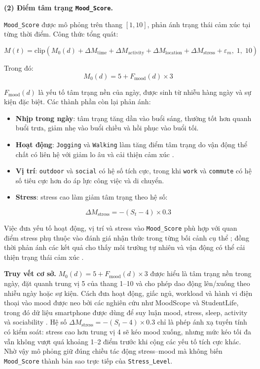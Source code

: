 \textbf{(2) Điểm tâm trạng \texttt{Mood\_Score}.}

\texttt{Mood\_Score} được mô phỏng trên thang $[1,10]$, phản ánh trạng thái cảm xúc tại từng thời điểm. Công thức tổng quát:

\begin{equation}
\label{eq:mood_score}
    M(t) =
    \text{clip}\left(
    M_0(d)
    + \Delta M_{\text{time}}
    + \Delta M_{\text{activity}}
    + \Delta M_{\text{location}}
    + \Delta M_{\text{stress}}
    + \varepsilon_m,\; 1,\; 10
    \right)
\end{equation}

Trong đó:
\begin{equation}
    M_0(d) = 5 + F_{\text{mood}}(d) \times 3
\end{equation}

$F_{\text{mood}}(d)$ là yếu tố tâm trạng nền của ngày, được sinh từ nhiễu hàng ngày và sự kiện đặc biệt. Các thành phần còn lại phản ánh:
\begin{itemize}
    \item \textbf{Nhịp trong ngày}: tâm trạng tăng dần vào buổi sáng, thường tốt hơn quanh buổi trưa, giảm nhẹ vào buổi chiều và hồi phục vào buổi tối.
    \item \textbf{Hoạt động}: \texttt{Jogging} và \texttt{Walking} làm tăng điểm tâm trạng do vận động thể chất có liên hệ với giảm lo âu và cải thiện cảm xúc \cite{salmon2001effects}.
    \item \textbf{Vị trí}: \texttt{outdoor} và \texttt{social} có hệ số tích cực, trong khi \texttt{work} và \texttt{commute} có hệ số tiêu cực hơn do áp lực công việc và di chuyển.
    \item \textbf{Stress}: stress cao làm giảm tâm trạng theo hệ số:
\end{itemize}

\begin{equation}
    \Delta M_{\text{stress}} = -(S_t - 4) \times 0.3
\end{equation}

Việc đưa yếu tố hoạt động, vị trí và stress vào \texttt{Mood\_Score} phù hợp với quan điểm stress phụ thuộc vào đánh giá nhận thức trong từng bối cảnh cụ thể \cite{lazarus1984stress}; đồng thời phản ánh các kết quả cho thấy môi trường tự nhiên và vận động có thể cải thiện trạng thái cảm xúc \cite{bratman2015nature, salmon2001effects}.

\textbf{Truy vết cơ sở.} $M_0(d)=5+F_{\text{mood}}(d)\times3$ được hiểu là tâm trạng nền trong ngày, đặt quanh trung vị 5 của thang 1--10 và cho phép dao động lên/xuống theo nhiễu ngày hoặc sự kiện. Cách đưa hoạt động, giấc ngủ, workload và hành vi điện thoại vào mood được neo bởi các nghiên cứu như MoodScope và StudentLife, trong đó dữ liệu smartphone được dùng để suy luận mood, stress, sleep, activity và sociability \cite{likamwa2013moodscope, wang2014studentlife}. Hệ số $\Delta M_{\text{stress}}=-(S_t-4)\times0.3$ chỉ là phép ánh xạ tuyến tính có kiểm soát: stress cao hơn trung vị 4 sẽ kéo mood xuống, nhưng mức kéo tối đa vẫn không vượt quá khoảng 1--2 điểm trước khi cộng các yếu tố tích cực khác. Nhờ vậy mô phỏng giữ đúng chiều tác động stress--mood mà không biến \texttt{Mood\_Score} thành bản sao trực tiếp của \texttt{Stress\_Level}.

